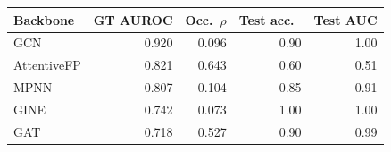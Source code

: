 \setlength{\tabcolsep}{3.6pt}
\begin{tabular}{lrrrr}
\toprule
Backbone & GT AUROC & Occ.\ $\rho$ & Test acc.\ & Test AUC \\
\midrule
GCN & 0.920 & 0.096 & 0.90 & 1.00 \\
AttentiveFP & 0.821 & 0.643 & 0.60 & 0.51 \\
MPNN & 0.807 & -0.104 & 0.85 & 0.91 \\
GINE & 0.742 & 0.073 & 1.00 & 1.00 \\
GAT & 0.718 & 0.527 & 0.90 & 0.99 \\
\bottomrule
\end{tabular}
